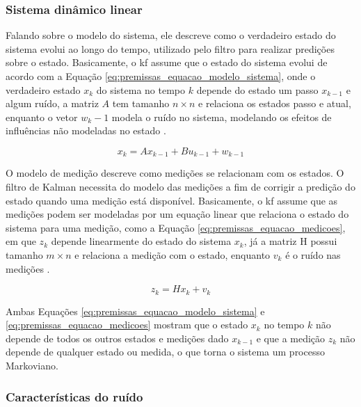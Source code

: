 \documentclass[acronym, symbols, table]{fei}
\begin{document}
			\subsubsection{Sistema dinâmico linear}
			
				Falando sobre o modelo do sistema, ele descreve como o verdadeiro estado do sistema evolui ao longo do tempo, utilizado pelo filtro para realizar predições sobre o estado. Basicamente, o \acrshort{kf} assume que o estado do sistema evolui de acordo com a Equação \eqref{eq:premissas_equacao_modelo_sistema}, onde o verdadeiro estado $x_k$ do sistema no tempo $k$ depende do estado um passo $x_{k-1}$ e algum ruído, a matriz $A$ tem tamanho $n \times n$ e relaciona os estados passo e atual, enquanto o vetor $w_k-1$ modela o ruído no sistema, modelando os efeitos de influências não modeladas no estado \cite{urrea2021kalman}.
				
				\begin{equation}\label{eq:premissas_equacao_modelo_sistema}
					x_k = Ax_{k-1} + Bu_{k-1} + w_{k-1}
				\end{equation}
			
				O modelo de medição descreve como medições se relacionam com os estados. O filtro de Kalman necessita do modelo das medições a fim de corrigir a predição do estado quando uma medição está disponível. Basicamente, o \acrshort{kf} assume que as medições podem ser modeladas por um equação linear que relaciona o estado do sistema para uma medição, como a Equação \eqref{eq:premissas_equacao_medicoes}, em que $z_k$ depende linearmente do estado do sistema $x_k$, já a matriz H possui tamanho $m \times n$ e relaciona a medição com o estado, enquanto $v_k$ é o ruído nas medições \cite{khodarahmi2023review}.
				
				\begin{equation}\label{eq:premissas_equacao_medicoes}
					z_k = Hx_k + v_k
				\end{equation}
			
				Ambas Equações \eqref{eq:premissas_equacao_modelo_sistema} e \eqref{eq:premissas_equacao_medicoes} mostram que o estado $x_k$ no tempo $k$ não depende de todos os outros estados e medições dado $x_{k-1}$ e que a medição $z_k$ não depende de qualquer estado ou medida, o que torna o sistema um processo Markoviano.
			
			\subsubsection{Características do ruído}
				
\end{document}
